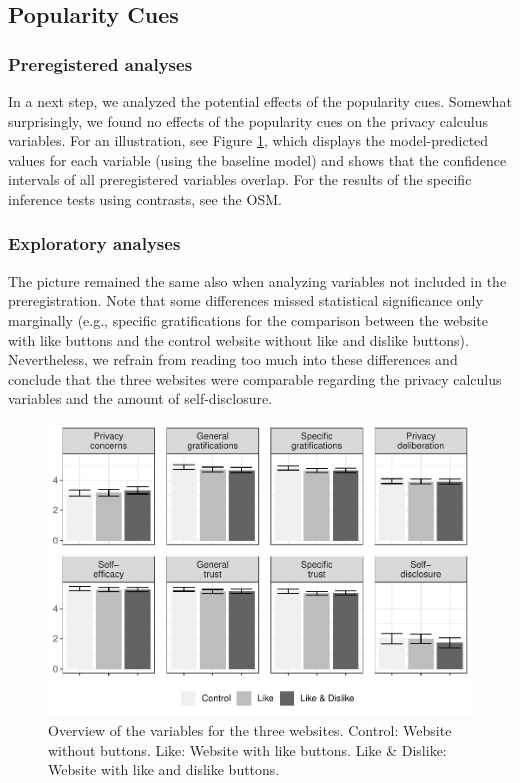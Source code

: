 \documentclass[
  english,
  man,floatsintext]{apa6}
\begin{document}
\hypertarget{popularity-cues}{%
\subsection{Popularity Cues}\label{popularity-cues}}

\hypertarget{preregistered-analyses-1}{%
\subsubsection{Preregistered analyses}\label{preregistered-analyses-1}}

In a next step, we analyzed the potential effects of the popularity cues.
Somewhat surprisingly, we found no effects of the popularity cues on the privacy calculus variables.
For an illustration, see Figure \ref{fig:popularitycues}, which displays the model-predicted values for each variable (using the baseline model) and shows that the confidence intervals of all preregistered variables overlap.
For the results of the specific inference tests using contrasts, see the OSM.

\hypertarget{exploratory-analyses-1}{%
\subsubsection{Exploratory analyses}\label{exploratory-analyses-1}}

The picture remained the same also when analyzing variables not included in the preregistration.
Note that some differences missed statistical significance only marginally (e.g., specific gratifications for the comparison between the website with like buttons and the control website without like and dislike buttons).
Nevertheless, we refrain from reading too much into these differences and conclude that the three websites were comparable regarding the privacy calculus variables and the amount of self-disclosure.

\begin{figure}[!h]
\includegraphics[width=\textwidth]{manuscript_files/figure-latex/popularitycues-1} \caption{Overview of the variables for the three websites. Control: Website without buttons. Like: Website with like buttons. Like \& Dislike: Website with like and dislike buttons.}\label{fig:popularitycues}
\end{figure}
\end{document}
